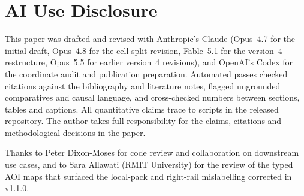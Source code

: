 \documentclass[sigconf,authorversion,natbib=true]{acmart}
\begin{document}
\section{AI Use Disclosure}\label{sec:aiuse}

This paper was drafted and revised with Anthropic's Claude (Opus~4.7 for the initial draft, Opus~4.8 for the cell-split revision, Fable~5.1 for the version~4 restructure, Opus~5.5 for earlier version~4 revisions), and OpenAI's Codex for the coordinate audit and publication preparation. Automated passes checked citations against the bibliography and literature notes, flagged ungrounded comparatives and causal language, and cross-checked numbers between sections, tables and captions. All quantitative claims trace to scripts in the released repository. The author takes full responsibility for the claims, citations and methodological decisions in the paper.

\begin{acks}
Thanks to Peter Dixon-Moses for code review and collaboration on downstream use cases, and to Sara Allawati (RMIT University) for the review of the typed AOI maps that surfaced the local-pack and right-rail mislabelling corrected in v1.1.0.
\end{acks}



\end{document}

